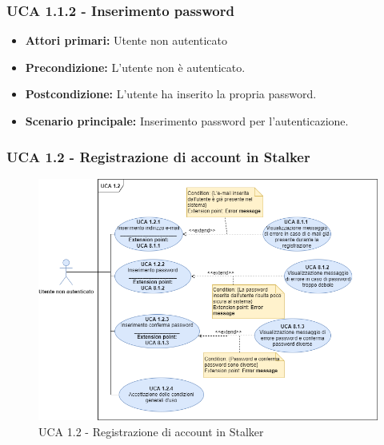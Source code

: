 \subsubsection{UCA 1.1.2 - Inserimento password}%
\begin{itemize}
\item \textbf{Attori primari:} Utente non autenticato
\item \textbf{Precondizione:} L'utente non è autenticato.
\item \textbf{Postcondizione:} L'utente ha inserito la propria password.
\item \textbf{Scenario principale:} Inserimento password per l'autenticazione.
\end{itemize}

\subsubsection{UCA 1.2 - Registrazione di account in Stalker}%

\begin{figure}[h]
  \centering
    \includegraphics[scale=0.4, center]{Sezioni/UseCase/Immagini/UCA1.2.png}
  \caption{UCA 1.2 -  Registrazione di account in Stalker}
\end{figure}

